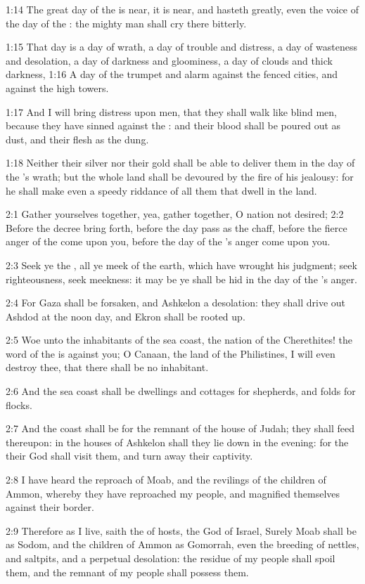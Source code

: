 1:14 The great day of the \LORD is near, it is near, and hasteth
greatly, even the voice of the day of the \LORD: the mighty man shall
cry there bitterly.

1:15 That day is a day of wrath, a day of trouble and distress, a day
of wasteness and desolation, a day of darkness and gloominess, a day
of clouds and thick darkness, 1:16 A day of the trumpet and alarm
against the fenced cities, and against the high towers.

1:17 And I will bring distress upon men, that they shall walk like
blind men, because they have sinned against the \LORD: and their blood
shall be poured out as dust, and their flesh as the dung.

1:18 Neither their silver nor their gold shall be able to deliver them
in the day of the \LORD's wrath; but the whole land shall be devoured
by the fire of his jealousy: for he shall make even a speedy riddance
of all them that dwell in the land.

2:1 Gather yourselves together, yea, gather together, O nation not
desired; 2:2 Before the decree bring forth, before the day pass as the
chaff, before the fierce anger of the \LORD come upon you, before the
day of the \LORD's anger come upon you.

2:3 Seek ye the \LORD, all ye meek of the earth, which have wrought his
judgment; seek righteousness, seek meekness: it may be ye shall be hid
in the day of the \LORD's anger.

2:4 For Gaza shall be forsaken, and Ashkelon a desolation: they shall
drive out Ashdod at the noon day, and Ekron shall be rooted up.

2:5 Woe unto the inhabitants of the sea coast, the nation of the
Cherethites! the word of the \LORD is against you; O Canaan, the land
of the Philistines, I will even destroy thee, that there shall be no
inhabitant.

2:6 And the sea coast shall be dwellings and cottages for shepherds,
and folds for flocks.

2:7 And the coast shall be for the remnant of the house of Judah; they
shall feed thereupon: in the houses of Ashkelon shall they lie down in
the evening: for the \LORD their God shall visit them, and turn away
their captivity.

2:8 I have heard the reproach of Moab, and the revilings of the
children of Ammon, whereby they have reproached my people, and
magnified themselves against their border.

2:9 Therefore as I live, saith the \LORD of hosts, the God of Israel,
Surely Moab shall be as Sodom, and the children of Ammon as Gomorrah,
even the breeding of nettles, and saltpits, and a perpetual
desolation: the residue of my people shall spoil them, and the remnant
of my people shall possess them.

